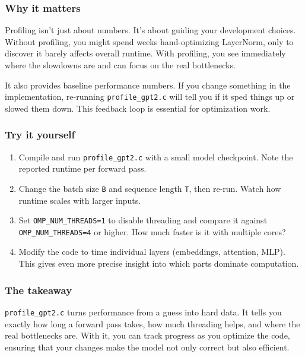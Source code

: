 \documentclass[
  letterpaper,
  DIV=11,
  numbers=noendperiod]{scrreprt}
\providecommand{\tightlist}{%
  \setlength{\itemsep}{0pt}\setlength{\parskip}{0pt}}
\begin{document}
\subsubsection{Why it matters}\label{why-it-matters-34}

Profiling isn't just about numbers. It's about guiding your development
choices. Without profiling, you might spend weeks hand-optimizing
LayerNorm, only to discover it barely affects overall runtime. With
profiling, you see immediately where the slowdowns are and can focus on
the real bottlenecks.

It also provides baseline performance numbers. If you change something
in the implementation, re-running \texttt{profile\_gpt2.c} will tell you
if it sped things up or slowed them down. This feedback loop is
essential for optimization work.

\subsubsection{Try it yourself}\label{try-it-yourself-42}

\begin{enumerate}
\def\labelenumi{\arabic{enumi}.}
\tightlist
\item
  Compile and run \texttt{profile\_gpt2.c} with a small model
  checkpoint. Note the reported runtime per forward pass.
\item
  Change the batch size \texttt{B} and sequence length \texttt{T}, then
  re-run. Watch how runtime scales with larger inputs.
\item
  Set \texttt{OMP\_NUM\_THREADS=1} to disable threading and compare it
  against \texttt{OMP\_NUM\_THREADS=4} or higher. How much faster is it
  with multiple cores?
\item
  Modify the code to time individual layers (embeddings, attention,
  MLP). This gives even more precise insight into which parts dominate
  computation.
\end{enumerate}

\subsubsection{The takeaway}\label{the-takeaway-43}

\texttt{profile\_gpt2.c} turns performance from a guess into hard data.
It tells you exactly how long a forward pass takes, how much threading
helps, and where the real bottlenecks are. With it, you can track
progress as you optimize the code, ensuring that your changes make the
model not only correct but also efficient.
\end{document}
